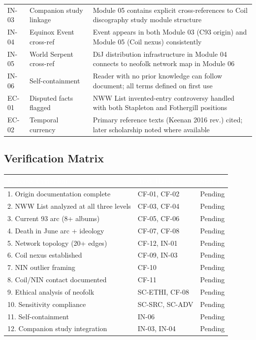 \documentclass[11pt,letterpaper]{article}
\newcommand{\tableheader}[1]{\textbf{\sffamily\textcolor{white}{#1}}}
\begin{document}
\begin{center}
\begin{tabularx}{\textwidth}{L{1.5cm}L{5cm}X}
IN-03 & Companion study linkage & Module 05 contains explicit cross-references to Coil discography study module structure \\
IN-04 & Equinox Event cross-ref & Event appears in both Module 03 (C93 origin) and Module 05 (Coil nexus) consistently \\
IN-05 & World Serpent cross-ref & DiJ distribution infrastructure in Module 04 connects to neofolk network map in Module 06 \\
IN-06 & Self-containment & Reader with no prior knowledge can follow document; all terms defined on first use \\
EC-01 & Disputed facts flagged & NWW List invented-entry controversy handled with both Stapleton and Fothergill positions \\
EC-02 & Temporal currency & Primary reference texts (Keenan 2016 rev.) cited; later scholarship noted where available \\
\bottomrule
\end{tabularx}
\end{center}

\subsection{Verification Matrix}

\begin{center}
\begin{tabularx}{\textwidth}{XL{3.5cm}C{1.5cm}}
\toprule
{}
\tableheader{Success Criterion} & \tableheader{Test ID(s)} & \tableheader{Status} \\
. Origin documentation complete & CF-01, CF-02 & Pending \\
2. NWW List analyzed at all three levels & CF-03, CF-04 & Pending \\
3. Current 93 arc (8+ albums) & CF-05, CF-06 & Pending \\
4. Death in June arc + ideology & CF-07, CF-08 & Pending \\
5. Network topology (20+ edges) & CF-12, IN-01 & Pending \\
6. Coil nexus established & CF-09, IN-03 & Pending \\
7. NIN outlier framing & CF-10 & Pending \\
8. Coil/NIN contact documented & CF-11 & Pending \\
9. Ethical analysis of neofolk & SC-ETHI, CF-08 & Pending \\
10. Sensitivity compliance & SC-SRC, SC-ADV & Pending \\
11. Self-containment & IN-06 & Pending \\
12. Companion study integration & IN-03, IN-04 & Pending \\
\bottomrule
\end{tabularx}
\end{center}
\end{document}

